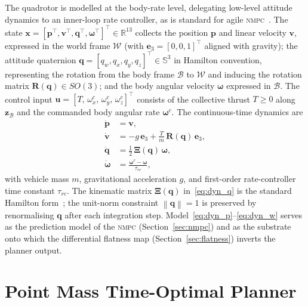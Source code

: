 \documentclass{ieeeaccess}
\newcommand{\R}{\mathbb{R}}
\newcommand{\norm}[1]{\left\| #1 \right\|}
\newcommand{\vect}[1]{\bm{#1}}
\newcommand{\mat}[1]{\mathbf{#1}}
\newcommand{\nmpc}{\textsc{nmpc}}
\begin{document}
The quadrotor is modelled at the body-rate level, delegating low-level
attitude dynamics to an inner-loop rate controller, as is standard for
agile \nmpc{}~\cite{hanover2021performance}.
The state
$\vect{x}=[\vect{p}^\top,\vect{v}^\top,\vect{q}^\top,
          \vect{\omega}^\top]^\top\in\R^{13}$
collects the position $\vect{p}$ and linear velocity $\vect{v}$,
expressed in the world frame $\mathcal{W}$ (with
$\vect{e}_3=[0,0,1]^\top$ aligned with gravity);
the attitude quaternion
$\vect{q}=[q_w,q_x,q_y,q_z]^\top\in\mathbb{S}^3$ in Hamilton convention,
representing the rotation from the body frame $\mathcal{B}$ to
$\mathcal{W}$ and inducing the rotation matrix
$\mat{R}(\vect{q})\in SO(3)$; and the body angular velocity
$\vect{\omega}$ expressed in $\mathcal{B}$.
The control input
$\vect{u}=[T,\,\omega_x^c,\,\omega_y^c,\,\omega_z^c]^\top$
consists of the collective thrust $T\geq 0$ along $\vect{z}_\mathcal{B}$
and the commanded body angular rate $\vect{\omega}^c$.
The continuous-time dynamics are
%
\begin{align}
  \dot{\vect{p}} &= \vect{v}, \label{eq:dyn_p} \\
  \dot{\vect{v}} &= -g\,\vect{e}_3
                    + \frac{T}{m}\,\mat{R}(\vect{q})\,\vect{e}_3,
                    \label{eq:dyn_v} \\
  \dot{\vect{q}} &= \tfrac{1}{2}\,\mat{\Xi}(\vect{q})\,\vect{\omega},
                    \label{eq:dyn_q} \\
  \dot{\vect{\omega}} &= \frac{\vect{\omega}^c - \vect{\omega}}{\tau_{rc}},
                    \label{eq:dyn_w}
\end{align}
%
with vehicle mass $m$, gravitational acceleration $g$, and first-order
rate-controller time constant $\tau_{rc}$.
The kinematic matrix $\mat{\Xi}(\vect{q})$ in~\eqref{eq:dyn_q} is the
standard Hamilton form~\cite{mellinger2011minimum}; the unit-norm
constraint $\norm{\vect{q}}=1$ is preserved by renormalising $\vect{q}$
after each integration step.
Model~\eqref{eq:dyn_p}--\eqref{eq:dyn_w} serves as the prediction model
of the \nmpc{} (Section~\ref{sec:nmpc}) and as the substrate onto which
the differential flatness map (Section~\ref{sec:flatness}) inverts the
planner output.

\section{Point Mass Time-Optimal Planner}
\label{sec:pmm}
\end{document}
